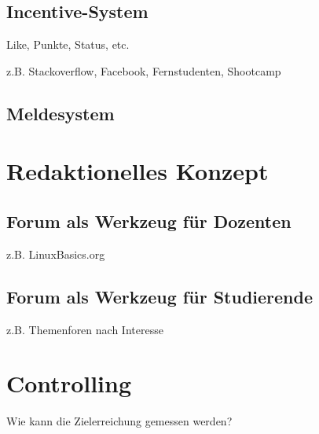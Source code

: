 
\subsection{Incentive-System} %
\label{sub:incentive_system}
Like, Punkte, Status, etc.

z.B. Stackoverflow, Facebook, Fernstudenten, Shootcamp

\subsection{Meldesystem} %
\label{sub:meldesystem}



\section{Redaktionelles Konzept} %
\label{sec:redaktionelles_konzept}
\subsection{Forum als Werkzeug für Dozenten} %
\label{sub:forum_als_werkzeug_fur_dozenten}
z.B. LinuxBasics.org

\subsection{Forum als Werkzeug für Studierende} %
\label{sub:forum_als_werkzeug_fur_studierende}
z.B. Themenforen nach Interesse

\section{Controlling} %
\label{sec:controlling}
Wie kann die Zielerreichung gemessen werden?
